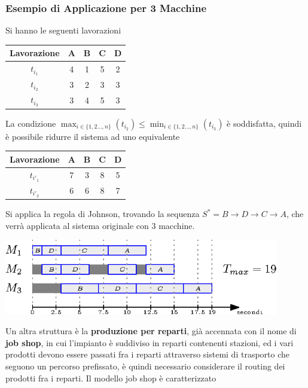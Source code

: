 \documentclass[10pt, letterpaper]{report}
\begin{document}
\subsubsection{Esempio di Applicazione per 3 Macchine}
Si hanno le seguenti lavorazioni \begin{center}
    \begin{tabular}{|c|c|c|c|c|}
        \hline
        Lavorazione & A & B & C & D \\ \hline
        $t_{i_1}$   & 4 & 1 & 5 & 2 \\ \hline
        $t_{i_2}$   & 3 & 2 & 3 & 3 \\ \hline
        $t_{i_3}$   & 3 & 4 & 5 & 3 \\ \hline
        \end{tabular}
\end{center}
La condizione $\max_{i\in\{1,2\dots ,n\}}(t_{i_2}) \le \min_{i\in\{1,2\dots ,n\}}(t_{i_3}) $ è soddisfatta, 
quindi è possibile ridurre il sistema ad uno equivalente \begin{center}
    \begin{tabular}{|c|c|c|c|c|}
        \hline
        Lavorazione & A & B & C & D \\ \hline
        $t_{i'_1}$   & 7 & 3 & 8 & 5 \\ \hline
        $t_{i'_2}$   & 6 & 6 & 8 & 7 \\ \hline
        \end{tabular}
\end{center}
Si applica la regola di Johnson, trovando la sequenza $S^*=B\rightarrow D\rightarrow C\rightarrow A$, che verrà 
applicata al sistema originale con 3 macchine.\begin{center}
    \includegraphics[width=0.9\textwidth ]{images/jhonson2.eps}
\end{center}
Un altra struttura è la \textbf{produzione per reparti}, già accennata con il nome di \textbf{job shop},
in cui l'impianto è suddiviso in reparti contenenti stazioni, ed i vari prodotti devono essere passati fra i 
reparti attraverso sistemi di trasporto che seguono un percorso 
prefissato, è quindi necessario considerare il routing dei prodotti fra i reparti. Il modello job shop è caratterizzato 
\end{document}
